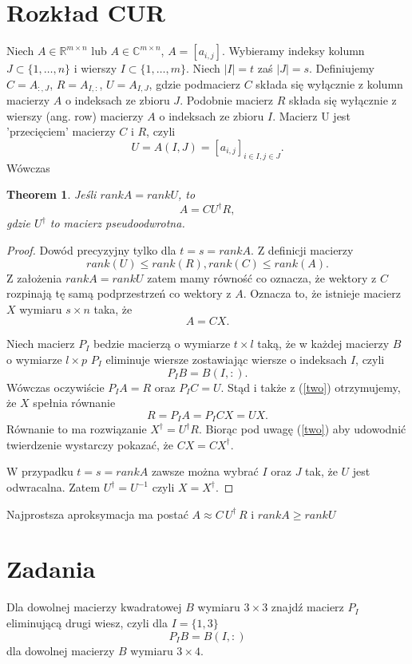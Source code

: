 \documentclass[12pt]{article}
\newtheorem{theorem}{Theorem}[section]
\newcommand{\R}{\mathbb{R}}
\newcommand{\C}{\mathbb{C}}
\begin{document}
\section{Rozkład CUR}
Niech $A\in\R^{m\times n}$ lub $A\in\C^{m\times n}$, $A=[a_{i,j}]$. Wybieramy indeksy kolumn $J\subset \{1,\ldots,n\}$ i wierszy $I\subset \{1,\ldots,m\}$. 
Niech $|I|=t$ zaś $|J|=s$.
Definiujemy
$C=A_{:,J}$, $R=A_{I,:}$, $U=A_{I,J}$,
gdzie podmacierz $C$ składa się wyłącznie z kolumn macierzy $A$ o indeksach ze zbioru $J$. Podobnie macierz $R$ składa się wyłącznie z wierszy (ang. row) macierzy $A$ o indeksach ze zbioru $I$. Macierz U jest 'przecięciem' macierzy $C$ i $R$, czyli
\[
U=A(I,J)=[a_{i,j}]_{i\in I, j\in J}.
\]
Wówczas
\begin{theorem}
Jeśli $rank A=rankU$, to
\[
A=C U^\dagger R,
\]
gdzie $U^\dagger$ to macierz pseudoodwrotna.
\end{theorem}
\begin{proof} Dowód precyzyjny tylko dla $t=s=rank A$. 
Z definicji macierzy
\[
rank(U)\leq rank (R),rank(C)\leq rank(A).
\]
Z założenia $rank A=rankU$ zatem mamy równość co oznacza, że wektory z $C$ rozpinają tę samą podprzestrzeń co wektory z $A$. Oznacza to, że istnieje macierz $X$ wymiaru $s\times n$ taka, że
\begin{equation}
\label{two}
A=CX.
\end{equation}

Niech macierz $P_I$ bedzie macierzą o wymiarze $t\times l$ taką, że w każdej macierzy $B$ o wymiarze $l\times p$ $P_I$ eliminuje wiersze zostawiając wiersze o indeksach $I$, czyli
\[
P_I B=B(I,:).
\]
Wówczas oczywiście $P_IA=R$ oraz  $P_IC=U$. Stąd i także z (\ref{two})
otrzymujemy, że $X$ spełnia równanie
\begin{equation}
\label{one}
R=P_IA=P_ICX=UX.
\end{equation}
Równanie to ma rozwiązanie $X^\dagger=U^\dagger R$. Biorąc pod uwagę 
(\ref{two}) aby udowodnić twierdzenie wystarczy pokazać, że $CX=CX^\dagger$.

W przypadku $t=s=rankA$ zawsze można wybrać $I$ oraz $J$ tak, że $U$ jest odwracalna. Zatem 
$U^\dagger=U^{-1}$ czyli
$X=X^\dagger$.
\end{proof}


 Najprostsza aproksymacja ma postać
$A \approx C\,U^\dagger\,R$ i  $rank A\geq rankU$

\section{Zadania}
Dla dowolnej macierzy kwadratowej $B$ wymiaru $3\times 3$ znajdź macierz $P_I$ eliminującą drugi wiesz, czyli dla $I=\{1,3\}$
\[
P_IB=B(I,:)
\]
dla dowolnej macierzy $B$ wymiaru $3\times 4$.
\end{document}
